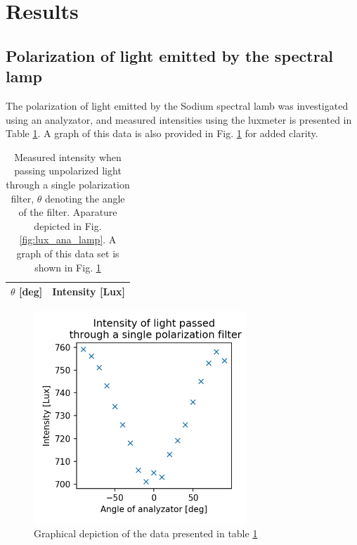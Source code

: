 \documentclass[11pt,a4paper, twocolumn]{article}
\begin{document}
\section{\label{sect:results}Results}
  
  \subsection{Polarization of light emitted by the spectral lamp}

  The polarization of light emitted by the Sodium spectral lamb was investigated using an analyzator, and measured intensities using the luxmeter is presented in Table \ref{tab:ana}. A graph of this data is also provided in Fig. \ref{fig:ana_plot} for added clarity.

  \begin{table}[H]
      \center
      \caption{Measured intensity when passing unpolarized light through a single polarization filter, $\theta$ denoting the angle of the filter. Aparature depicted in Fig. \ref{fig:lux_ana_lamp}. A graph of this data set is shown in Fig. \ref{fig:ana_plot}}
       \begin{tabular}{r | l}
        $\theta$ [deg] & Intensity [Lux] \\ \hline
         
       \end{tabular}
       \label{tab:ana}
  \end{table}

  \begin{figure}[H]
    \center
    \includegraphics[width=8cm]{scripts/polartest.png}
    \caption{Graphical depiction of the data presented in table \ref{tab:ana}}
    \label{fig:ana_plot}
  \end{figure}
\end{document}
